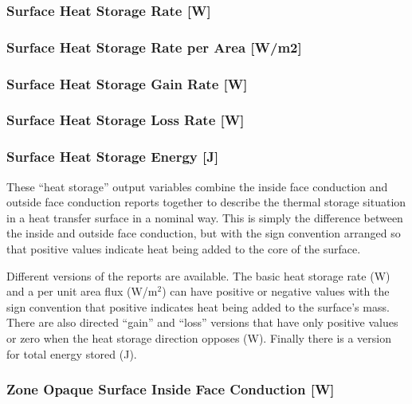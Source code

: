 \subsubsection{Surface Heat Storage Rate {[}W{]}}\label{surface-heat-storage-rate-w}

\subsubsection{Surface Heat Storage Rate per Area {[}W/m2{]}}\label{surface-heat-storage-rate-per-area-wm2}

\subsubsection{Surface Heat Storage Gain Rate {[}W{]}}\label{surface-heat-storage-gain-rate-w}

\subsubsection{Surface Heat Storage Loss Rate {[}W{]}}\label{surface-heat-storage-loss-rate-w}

\subsubsection{Surface Heat Storage Energy {[}J{]}}\label{surface-heat-storage-energy-j}

These ``heat storage'' output variables combine the inside face conduction and outside face conduction reports together to describe the thermal storage situation in a heat transfer surface in a nominal way. This is simply the difference between the inside and outside face conduction, but with the sign convention arranged so that positive values indicate heat being added to the core of the surface.

Different versions of the reports are available. The basic heat storage rate (W) and a per unit area flux (W/m\(^{2}\)) can have positive or negative values with the sign convention that positive indicates heat being added to the surface's mass. There are also directed ``gain'' and ``loss'' versions that have only positive values or zero when the heat storage direction opposes (W). Finally there is a version for total energy stored (J).

\subsubsection{Zone Opaque Surface Inside Face Conduction {[}W{]}}\label{zone-opaque-surface-inside-face-conduction-w}

